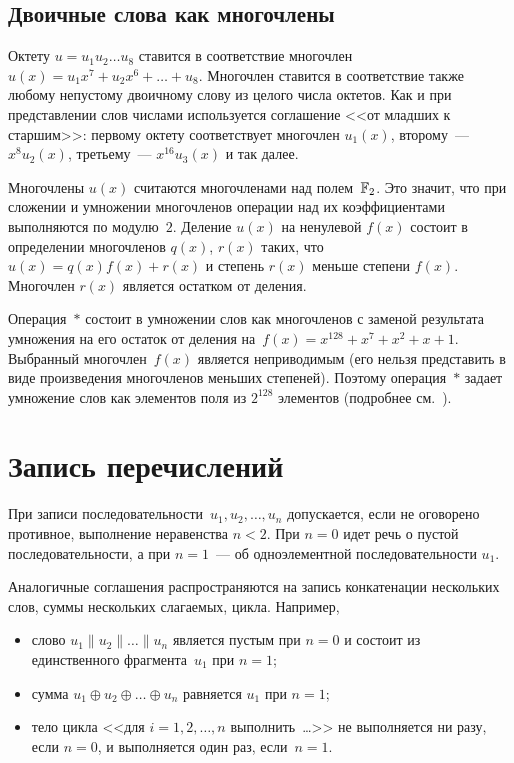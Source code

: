 \subsection{Двоичные слова как многочлены}\label{DEFS.Poly}

Октету $u=u_1 u_2\ldots u_8$ ставится в соответствие многочлен
$u(x)=u_1 x^7+u_2 x^6 +\ldots + u_8$. 
%
Многочлен ставится в соответствие также любому непустому
двоичному слову из целого числа октетов.
Как и при представлении слов числами используется 
соглашение <<от младших к старшим>>:
первому октету соответствует многочлен $u_1(x)$,
второму~--- $x^8 u_2(x)$, третьему~--- $x^{16}u_3(x)$ и так далее.

Многочлены $u(x)$ считаются многочленами над полем~$\mathbb{F}_2$. 
Это значит, что при сложении и умножении многочленов операции над их
коэффициентами выполняются по модулю~$2$.
%
Деление $u(x)$ на ненулевой $f(x)$ состоит в определении многочленов 
$q(x)$, $r(x)$ таких, что $u(x)=q(x)f(x)+r(x)$ и степень $r(x)$ меньше 
степени $f(x)$. 
Многочлен $r(x)$ является остатком от деления.

Операция~$\ast$ состоит в умножении слов как многочленов с заменой результата
умножения на его остаток от деления на~$f(x)=x^{128}+x^7+x^2+x+1$. 
%
Выбранный многочлен~$f(x)$ является неприводимым (его нельзя представить
в виде произведения многочленов меньших степеней).
Поэтому операция~$\ast$ задает умножение слов как элементов поля из $2^{128}$
элементов (подробнее см.~\cite{LidNid88}).

\section{Запись перечислений}\label{DEFS.Seqs}

При записи последовательности~$u_1,u_2,\ldots,u_n$ 
допускается, если не оговорено противное, выполнение неравенства $n<2$.
При $n=0$ идет речь о пустой последовательности, 
а при $n=1$~--- об одноэлементной последовательности $u_1$.

Аналогичные соглашения распространяются на запись конкатенации нескольких
слов, суммы нескольких слагаемых,  цикла.
%
Например,
\begin{itemize}
\item
слово $u_1\parallel u_2\parallel\ldots\parallel u_n$ является пустым при $n=0$ 
и состоит из единственного фрагмента~$u_1$ при $n=1$;
\item
сумма $u_1\oplus u_2\oplus\ldots\oplus u_n$ равняется $u_1$ при $n=1$;
%
\item
тело цикла <<для $i=1,2,\ldots,n$ выполнить~\ldots>>
не выполняется ни разу, если $n=0$, и выполняется один раз, если~$n=1$.
\end{itemize}


